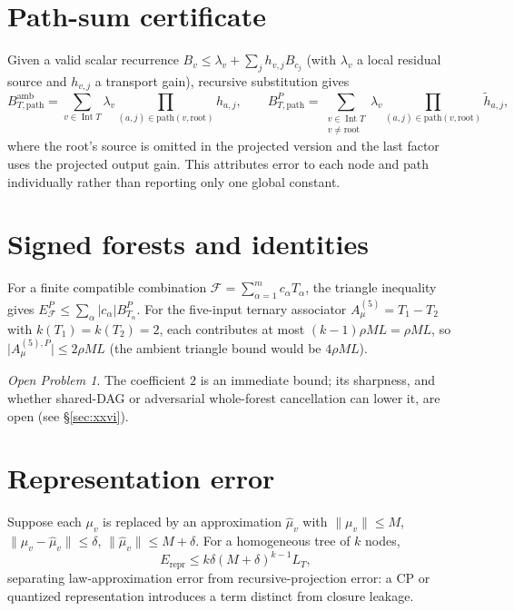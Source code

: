 \documentclass[11pt]{amsart}
\theoremstyle{definition}
\theoremstyle{remark}
\newtheorem{openproblem}[theorem]{Open Problem}
\DeclareMathOperator{\Int}{Int}
\begin{document}
\section{Path-sum certificate}

Given a valid scalar recurrence $B_v \le \lambda_v + \sum_j h_{v,j}B_{c_j}$
(with $\lambda_v$ a local residual source and $h_{v,j}$ a transport
gain), recursive substitution gives
\[
B_{T,\mathrm{path}}^{\mathrm{amb}}
= \sum_{v\in\Int T} \lambda_v \prod_{(a,j)\in\mathrm{path}(v,\mathrm{root})} h_{a,j},
\qquad
B_{T,\mathrm{path}}^{P}
= \sum_{\substack{v\in\Int T\\ v\neq\mathrm{root}}} \lambda_v \prod_{(a,j)\in\mathrm{path}(v,\mathrm{root})} \tilde h_{a,j},
\]
where the root's source is omitted in the projected version and the
last factor uses the projected output gain. This attributes error to
each node and path individually rather than reporting only one global
constant.

\section{Signed forests and identities}
\label{sec:signed-forests}

For a finite compatible combination $\mathcal F = \sum_{\alpha=1}^m c_\alpha T_\alpha$,
the triangle inequality gives
$E_{\mathcal F}^{P} \le \sum_\alpha \lvert c_\alpha\rvert B_{T_\alpha}^P$.
For the five-input ternary associator $A_\mu^{(5)}=T_1-T_2$ with
$k(T_1)=k(T_2)=2$, each contributes at most $(k-1)\rho ML=\rho ML$, so
$\lvert A_\mu^{(5),P}\rvert \le 2\rho ML$ (the ambient triangle bound
would be $4\rho ML$).

\begin{openproblem}
The coefficient $2$ is an immediate bound; its sharpness, and whether
shared-DAG or adversarial whole-forest cancellation can lower it, are
open (see \S\ref{sec:xxvi}).
\end{openproblem}

\section{Representation error}

Suppose each $\mu_v$ is replaced by an approximation $\widehat\mu_v$
with $\lVert\mu_v\rVert\le M$, $\lVert\mu_v-\widehat\mu_v\rVert\le\delta$,
$\lVert\widehat\mu_v\rVert\le M+\delta$. For a homogeneous tree of $k$
nodes,
\[
E_{\mathrm{repr}} \le k\delta(M+\delta)^{k-1}L_T,
\]
separating law-approximation error from recursive-projection error: a
CP or quantized representation introduces a term distinct from closure
leakage.
\end{document}
